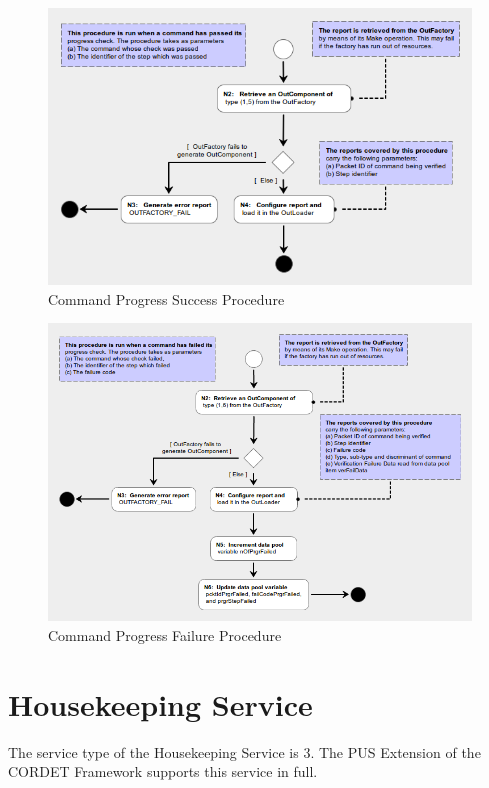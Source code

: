 \documentclass[a4paper,10pt]{article}
\let\stdsection\section
\renewcommand\section{\newpage\stdsection}
\begin{document}
\begin{figure}[htbp]
 \centering
 \includegraphics[scale=0.415,keepaspectratio=true]{CrPsCmdPrgrSucc.png}
 \caption{Command Progress Success Procedure}
 \label{fig:CmdPrgrSucc}
\end{figure}

\begin{figure}[H]
 \centering
 \includegraphics[scale=0.415,keepaspectratio=true]{CrPsCmdPrgrFail.png}
 \caption{Command Progress Failure Procedure}
 \label{fig:CmdPrgrFail}
\end{figure}

\section{Housekeeping Service}\label{sec:serv3}
The service type of the Housekeeping Service is 3. The PUS Extension of the CORDET Framework supports this service in full.
\end{document}
